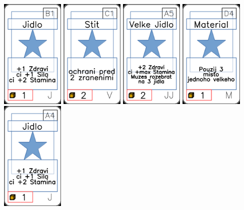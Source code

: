 \documentclass[a4paper]{article}
\begin{document}
	\includegraphics[width=3.0cm]{img-1_5}
	\includegraphics[width=3.0cm]{img-1_70}
	\includegraphics[width=3.0cm]{img-1_34}
	\includegraphics[width=3.0cm]{img-1_48}
	\includegraphics[width=3.0cm]{img-1_3}
\end{document}
